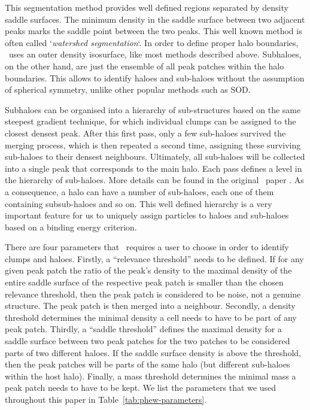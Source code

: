 This segmentation method provides well defined regions separated by
density saddle surfaces. The minimum density in the saddle surface
between two adjacent peaks marks the saddle point between the two
peaks.  This well known method is often called `\emph{watershed
segmentation}`. In order to define proper halo boundaries, \phew\ uses
an outer density isosurface, like most methods described
above. Subhaloes, on the other hand, are just the ensemble of all
peak patches within the halo boundaries. This allows to identify
haloes and sub-haloes without the assumption of spherical symmetry,
unlike other popular methods such as SOD.

Subhaloes can be organised into a hierarchy of sub-structures based
on the same steepest gradient technique, for which individual clumps
can be assigned to the closest densest peak.  After this first pass,
only a few sub-haloes survived the merging process, which is then
repeated a second time, assigning these surviving sub-haloes to their
densest neighbours.  Ultimately, all sub-haloes will be collected into
a single peak that corresponds to the main halo. Each pass defines a
level in the hierarchy of sub-haloes. More details can be found in the
original \phew\ paper \citep{PHEW}.  As a consequence, a halo can have
a number of sub-haloes, each one of them containing subsub-haloes and
so on.  This well defined hierarchy is a very important feature for us
to uniquely assign particles to haloes and sub-haloes based on a
binding energy criterion.
 
There are four parameters that \phew\ requires a user to choose in
order to identify clumps and haloes.  Firstly, a ``relevance
threshold'' needs to be defined.  If for any given peak patch the
ratio of the peak's density to the maximal density of the entire
saddle surface of the respective peak patch is smaller than the chosen
relevance threshold, then the peak patch is considered to be noise,
not a genuine structure.  The peak patch is then merged into a
neighbour.  Secondly, a density threshold determines the minimal
density a cell needs to have to be part of any peak patch.  Thirdly, a
``saddle threshold'' defines the maximal density for a saddle surface
between two peak patches for the two patches to be considered parts of
two different haloes.  If the saddle surface density is above the
threshold, then the peak patches will be parts of the same halo (but
different sub-haloes within the host halo).  Finally, a mass threshold
determines the minimal mass a peak patch needs to have to be kept.  We
list the parameters that we used throughout this paper in Table~\ref{tab:phew-parameters}.

